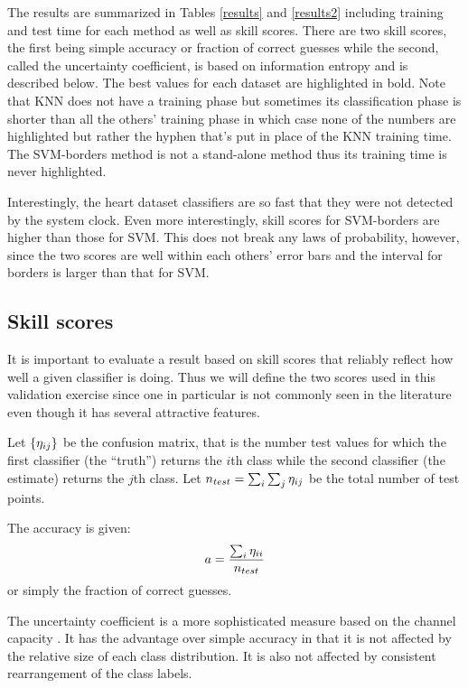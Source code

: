 The results are summarized in Tables \ref{results} and \ref{results2} including training
and test time for each method as well as skill scores. There are two skill scores,
the first being simple accuracy or fraction of correct guesses while the second,
called the uncertainty coefficient, is based on information entropy and is described
below.
The best values for each dataset are highlighted in bold.
Note that KNN does not have a training phase but sometimes its classification phase
is shorter than all the others' training phase in which case none of the numbers
are highlighted but rather the hyphen that's put in place of the KNN training
time.
The SVM-borders method is not a stand-alone method thus its training time is never
highlighted.

Interestingly, the heart dataset classifiers are so fast that they were not detected
by the system clock. Even more interestingly, skill scores for SVM-borders 
are higher than those for SVM. This does not break any
laws of probability, however, since the two scores are well within each others' error
bars and the interval for borders is larger than that for SVM.

\subsection{Skill scores}

It is important to evaluate a result based on skill scores that reliably reflect
how well a given classifier is doing.
Thus we will define the two scores used in this validation exercise 
since one in particular is not commonly seen in the literature even though it has several
attractive features.

Let $\lbrace \eta_{ij} \rbrace$ be the confusion matrix, that is the number
test values for which the first classifier (the ``truth'') returns the $i$th class
while the second classifier (the estimate) returns the $j$th class.
Let $n_{test}=\sum_i \sum_j \eta_{ij}$ be the total number of test points.

The accuracy is given:
\begin{equation}
a=\frac{\sum_i \eta_{ii}}{n_{test}}
\label{accuracy}
\end{equation}
or simply the fraction of correct guesses.

The uncertainty coefficient is a more sophisticated measure based on the channel 
capacity \citep{Shannon}. It has the advantage over simple accuracy in that 
it is not affected by the relative size of each class distribution.
It is also not affected by consistent rearrangement of the class labels.

